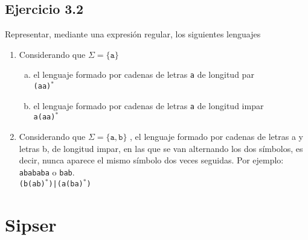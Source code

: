 \documentclass{article}
\begin{document}
\subsection*{Ejercicio 3.2}
Representar, mediante una expresión regular, los siguientes lenguajes
\begin{enumerate}
    \item  Considerando que $\Sigma=\{\texttt{a}\}$
    \begin{enumerate}[a)]
        \item el lenguaje formado por cadenas de letras \texttt{a} de longitud par\\
        \texttt{(aa)$^*$}
        
        \item el lenguaje formado por cadenas de letras \texttt{a} de longitud impar\\
        \texttt{a(aa)$^*$}
    \end{enumerate}
    
    \item Considerando que $\Sigma=\{\texttt{a},\texttt{b}\}$ , el lenguaje formado por cadenas de letras a y letras b, de longitud impar, en las que se van alternando los dos símbolos, es decir, nunca aparece el mismo símbolo dos veces seguidas. Por ejemplo: \texttt{abababa} o \texttt{bab}.\\
    \texttt{(b(ab)$^*$)|(a(ba)$^*$)}
\end{enumerate}

\section*{Sipser}
\end{document}
